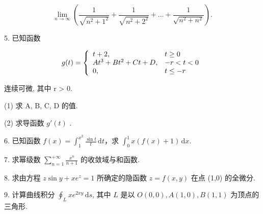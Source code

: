 \documentclass{examcollection}
\renewcommand{\displayformula}[1]{\[#1\]}
\begin{document}
{\begin{minipage}{\textwidth}
\displayformula{\lim _ {n \rightarrow \infty} \left(\frac {1}{\sqrt {n ^ {2} + 1 ^ {2}}} + \frac {1}{\sqrt {n ^ {2} + 2 ^ {2}}} + \dots + \frac {1}{\sqrt {n ^ {2} + n ^ {2}}}\right).}\par
5. 已知函数\par
\displayformula{g (t) = \left\{ \begin{array}{l l} t + 2, & t \geq 0 \\ A t ^ {3} + B t ^ {2} + C t + D, & - r <   t <   0 \\ 0, & t \leq - r \end{array} \right.}\par
连续可微, 其中 r > 0.\par
(1) 求 A, B, C, D 的值.\par
(2) 求导函数  $g'(t)$ .\par
6. 已知函数 $f(x) = \int_{1}^{x^2} \frac{\sin t}{t} \, \mathrm{d}t$，求 $\int_{0}^{1} x(f(x) + 1) \, \mathrm{d}x$.\par
7. 求幂级数 $\sum_{n=1}^{+\infty} \frac{x^n}{n+1}$ 的收敛域与和函数.\par
8. 求由方程 $z \sin y + xe^z = 1$ 所确定的隐函数 $z = f(x, y)$ 在点 (1,0) 的全微分.\par
9. 计算曲线积分 $\oint_{L} x e^{2xy} \, \mathrm{d}s$, 其中 $L$ 是以 $O(0,0), A(1,0), B(1,1)$ 为顶点的三角形.\par
\end{minipage}}
\ifdim\dimexpr\ht\proofbox+\dp\proofbox\relax>\textheight
\noindent\resizebox{!}{\textheight}{\usebox{\proofbox}}\else\noindent\usebox{\proofbox}\fi\clearpage
\end{document}
